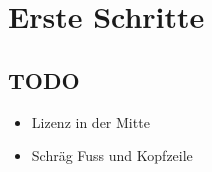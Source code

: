 \section{Erste Schritte }
\subsection{TODO}
	\begin{itemize}
	\item Lizenz in der Mitte
	\item Schräg Fuss und Kopfzeile
	\end{itemize}